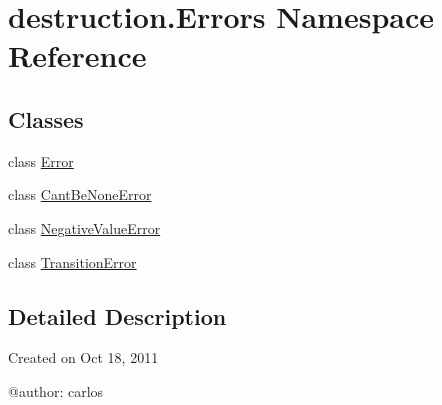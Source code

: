 \hypertarget{namespacedestruction_1_1_errors}{\section{destruction.\-Errors Namespace Reference}
\label{namespacedestruction_1_1_errors}
}
\subsection*{Classes}
\begin{DoxyCompactItemize}
\item 
class \hyperlink{classdestruction_1_1_errors_1_1_error}{Error}
\item 
class \hyperlink{classdestruction_1_1_errors_1_1_cant_be_none_error}{Cant\-Be\-None\-Error}
\item 
class \hyperlink{classdestruction_1_1_errors_1_1_negative_value_error}{Negative\-Value\-Error}
\item 
class \hyperlink{classdestruction_1_1_errors_1_1_transition_error}{Transition\-Error}
\end{DoxyCompactItemize}


\subsection{Detailed Description}
\begin{DoxyVerb}Created on Oct 18, 2011

@author: carlos
\end{DoxyVerb}
 